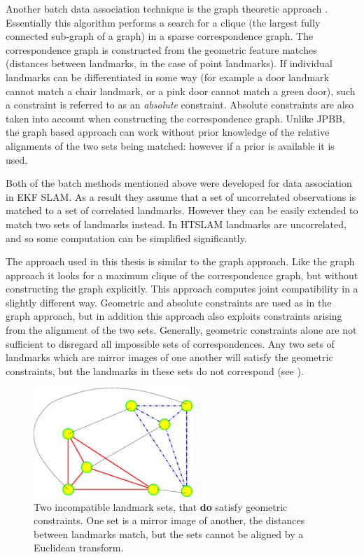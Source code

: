 Another batch data association technique is the graph theoretic
approach \cite{tardos02:_mappin_local_indoor_envir_using_sonar_data}.
Essentially this algorithm performs a search for a clique (the largest
fully connected sub-graph of a graph) in a sparse correspondence graph.
The correspondence graph is constructed from the geometric feature
matches (distances between landmarks, in the case of point landmarks).
If individual landmarks can be differentiated in some way (for example
a door landmark cannot match a chair landmark, or a pink door cannot match
a green door), such a constraint is referred to as an {\it absolute}
constraint. Absolute constraints are also taken into account when
constructing the correspondence graph. Unlike JPBB, the graph based
approach can work without prior knowledge of the relative alignments
of the two sets being matched: however if a prior is available it is
used.

Both of the batch methods mentioned above were developed for data
association in EKF SLAM. As a result they assume that a set of
uncorrelated observations is matched to a set of correlated
landmarks. However they can be easily extended to match two sets of
landmarks instead. In HTSLAM landmarks are uncorrelated, and so some
computation can be simplified significantly.

The approach used in this thesis is similar to the graph approach.
Like the graph approach it looks for a maximum clique of the
correspondence graph, but without constructing the graph explicitly.
This approach computes joint compatibility in a slightly different
way. Geometric and absolute constraints are used as in the graph
approach, but in addition this approach also exploits constraints
arising from the alignment of the two sets. Generally, geometric
constraints alone are not sufficient to disregard all impossible sets
of correspondences. Any two sets of landmarks which are mirror images
of one another will satisfy the geometric constraints, but the
landmarks in these sets do not correspond (see
).

\begin{figure}[htbp]
  \centering
  \includegraphics[width=6cm]{Pics/fig_mirror_sets}
  \caption[Reflection and alignment]{Two incompatible landmark sets, that {\bf do} satisfy
    geometric constraints. One set is a mirror image of another, the
    distances between landmarks match, but the sets cannot be aligned
    by a Euclidean transform.
}
  \label{fig:mirror_sets}
\end{figure}

